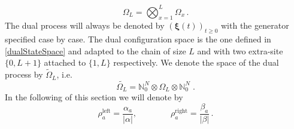 \documentclass[10pt]{article}
\numberwithin{equation}{section}
\numberwithin{equation}{subsection}
\newcommand{\dt}{\;.}
\begin{document}
\begin{equation}\label{stateSpace-Chain}
	\Omega_{L}=\bigotimes_{x=1}^{L} \Omega_{x}\,.
\end{equation}
 The dual process will always be denoted by $(\bm{\xi}(t))_{t\geq 0}$ with the generator specified case by case. The dual configuration space is the one defined in \eqref{dualStateSpace} and adapted to the chain of size $L$ and with two extra-site $\{0,L+1\}$ attached to $\{1,L\}$ respectively. 
 We denote the space of the dual process by $\widetilde{\Omega}_{L}$, i.e.
\begin{equation}\label{dualSpace-chain}
	\widetilde{\Omega_{L}}=\mathbb{N}_{0}^{N}\otimes \Omega_{L}\otimes \mathbb{N}_{0}^{N}\dt
\end{equation}
In the following of this section we will denote by 
\begin{equation}
	\rho_{a}^{\text{left}}=\frac{\alpha_{a}}{|\alpha|},\qquad \qquad \rho_{a}^{\text{right}}=\frac{\beta_{a}}{|\beta|}\,.
\end{equation}
\end{document}
